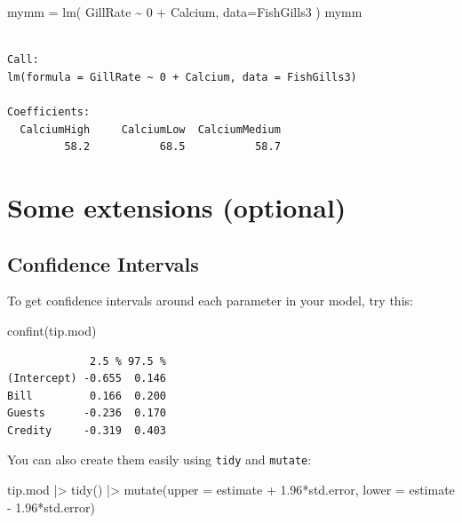 \documentclass[
  letterpaper,
  DIV=11,
  numbers=noendperiod]{scrreprt}
\newenvironment{Shaded}{\begin{snugshade}}{\end{snugshade}}
\newcommand{\AttributeTok}[1]{\textcolor[rgb]{0.49,0.56,0.16}{#1}}
\newcommand{\DecValTok}[1]{\textcolor[rgb]{0.25,0.63,0.44}{#1}}
\newcommand{\FloatTok}[1]{\textcolor[rgb]{0.25,0.63,0.44}{#1}}
\newcommand{\FunctionTok}[1]{\textcolor[rgb]{0.02,0.16,0.49}{#1}}
\newcommand{\NormalTok}[1]{\textcolor[rgb]{0.00,0.44,0.13}{#1}}
\newcommand{\OtherTok}[1]{\textcolor[rgb]{0.00,0.44,0.13}{#1}}
\newcommand{\SpecialCharTok}[1]{\textcolor[rgb]{0.25,0.44,0.63}{#1}}
\begin{document}
\begin{Shaded}
\begin{Highlighting}[]
\NormalTok{mymm }\OtherTok{=} \FunctionTok{lm}\NormalTok{( GillRate }\SpecialCharTok{\textasciitilde{}} \DecValTok{0} \SpecialCharTok{+}\NormalTok{ Calcium, }\AttributeTok{data=}\NormalTok{FishGills3 )}
\NormalTok{mymm}
\end{Highlighting}
\end{Shaded}

\begin{verbatim}

Call:
lm(formula = GillRate ~ 0 + Calcium, data = FishGills3)

Coefficients:
  CalciumHigh     CalciumLow  CalciumMedium  
         58.2           68.5           58.7  
\end{verbatim}

\hypertarget{some-extensions-optional}{%
\section{Some extensions (optional)}\label{some-extensions-optional}}

\hypertarget{confidence-intervals}{%
\subsection{Confidence Intervals}\label{confidence-intervals}}

To get confidence intervals around each parameter in your model, try
this:

\begin{Shaded}
\begin{Highlighting}[]
\FunctionTok{confint}\NormalTok{(tip.mod)}
\end{Highlighting}
\end{Shaded}

\begin{verbatim}
             2.5 % 97.5 %
(Intercept) -0.655  0.146
Bill         0.166  0.200
Guests      -0.236  0.170
Credity     -0.319  0.403
\end{verbatim}

You can also create them easily using \texttt{tidy} and \texttt{mutate}:

\begin{Shaded}
\begin{Highlighting}[]
\NormalTok{tip.mod }\SpecialCharTok{|\textgreater{}} 
  \FunctionTok{tidy}\NormalTok{() }\SpecialCharTok{|\textgreater{}} 
  \FunctionTok{mutate}\NormalTok{(}\AttributeTok{upper =}\NormalTok{ estimate }\SpecialCharTok{+} \FloatTok{1.96}\SpecialCharTok{*}\NormalTok{std.error,}
         \AttributeTok{lower =}\NormalTok{ estimate }\SpecialCharTok{{-}} \FloatTok{1.96}\SpecialCharTok{*}\NormalTok{std.error)}
\end{Highlighting}
\end{Shaded}
\end{document}
